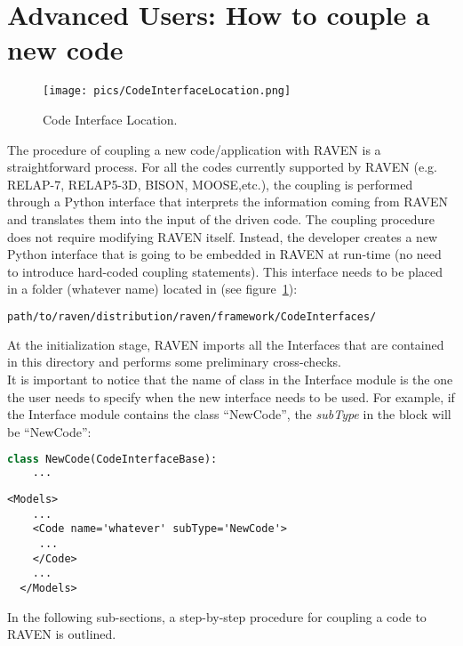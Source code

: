 \section{Advanced Users: How to couple a new code}
\label{sec:newCodeCoupling}
\begin{figure}
\centering
\texttt{[image: pics/CodeInterfaceLocation.png]}
\caption{Code Interface Location.}
\label{fig:codeinterface}
\end{figure}
The procedure of coupling a new code/application with RAVEN is a straightforward process.
For all the codes currently supported by RAVEN (e.g. RELAP-7, RELAP5-3D,
BISON, MOOSE,etc.), the coupling is performed through a Python interface that interprets the information coming from RAVEN and translates them into the
  input of the driven code.
The coupling procedure does not require modifying RAVEN itself. Instead, the developer creates a new Python interface that is going to be embedded
 in RAVEN at run-time (no need to introduce  hard-coded coupling statements).
 This interface needs to be placed in a folder (whatever name) located in (see figure~\ref{fig:codeinterface}):
\begin{lstlisting}[language=bash]
 path/to/raven/distribution/raven/framework/CodeInterfaces/
\end{lstlisting}
At the initialization stage, RAVEN imports all the Interfaces that are contained in this directory and performs some preliminary cross-checks.
\\It is important to notice that the name of class in the Interface module is the one the user needs to specify when the new interface 
needs to be used. For example, if the Interface module contains the class 	``NewCode'', the \textit{subType} in the  block will be 	``NewCode'':
\begin{lstlisting}[language=python]
  class NewCode(CodeInterfaceBase):
    ...
\end{lstlisting}
\begin{lstlisting}[style=XML,morekeywords={name,file}] %moreemph={name,file}]
  <Models>
    ...
    <Code name='whatever' subType='NewCode'>
     ...
    </Code>
    ...
  </Models>
\end{lstlisting}
In the following sub-sections, a step-by-step procedure for coupling a code to RAVEN is outlined.
